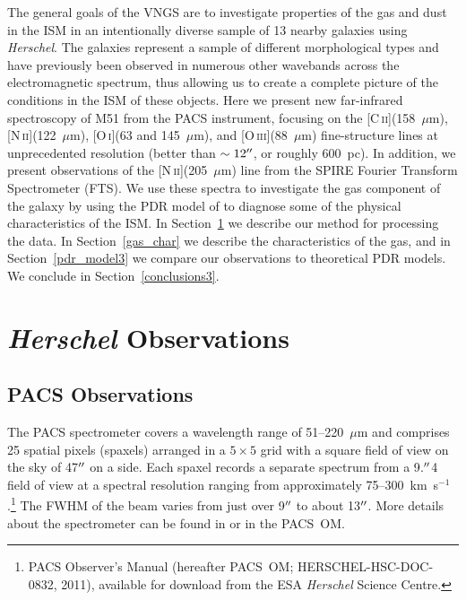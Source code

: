 The general goals of the VNGS are to investigate properties of the gas and dust in the ISM in an intentionally diverse sample of 13 nearby galaxies using \emph{Herschel}.  The galaxies represent a sample of different morphological types and have previously been observed in numerous other wavebands across the electromagnetic spectrum, thus allowing us to create a complete picture of the conditions in the ISM of these objects.  Here we present new far-infrared spectroscopy of M51 from the PACS instrument, focusing on the [C\,\textsc{ii}](158~$\mu$m), [N\,\textsc{ii}](122~$\mu$m), [O\,\textsc{i}](63 and 145~$\mu$m), and [O\,\textsc{iii}](88~$\mu$m) fine-structure lines at unprecedented resolution (better than $\sim 12\mbox{$^{\prime\prime}$}$, or roughly 600~pc).  In addition, we present observations of the [N\,\textsc{ii}](205~$\mu$m) line from the SPIRE Fourier Transform Spectrometer (FTS).  We use these spectra to investigate the gas component of the galaxy by using the PDR model of \citet{1999ApJ...527..795K, 2006ApJ...644..283K} to diagnose some of the physical characteristics of the ISM.  In Section~\ref{Herschel_obs3} we describe our method for processing the data.  In Section~\ref{gas_char} we describe the characteristics of the gas, and in Section~\ref{pdr_model3} we compare our observations to theoretical PDR models.  We conclude in Section~\ref{conclusions3}.

\section{\emph{Herschel} Observations}\label{Herschel_obs3}

\subsection{PACS Observations}\label{pacs_obs}
The PACS spectrometer covers a wavelength range of 51--220~$\mu$m and comprises 25 spatial pixels (spaxels) arranged in a $5 \times 5$ grid with a square field of view on the sky of 47$\mbox{$^{\prime\prime}$}$ on a side.  Each spaxel records a separate spectrum from a 9$.\mbox{$^{\prime\prime}$}$4 field of view at a spectral resolution ranging from approximately 75--300~km~s$^{-1}$.\footnote{PACS Observer's Manual (hereafter PACS~OM; HERSCHEL-HSC-DOC-0832, 2011), available for download from the ESA \emph{Herschel} Science Centre.}  The FWHM of the beam varies from just over 9$\mbox{$^{\prime\prime}$}$ to about 13$\mbox{$^{\prime\prime}$}$.  More details about the spectrometer can be found in \citet{2010A&A...518L...2P} or in the PACS~OM.

